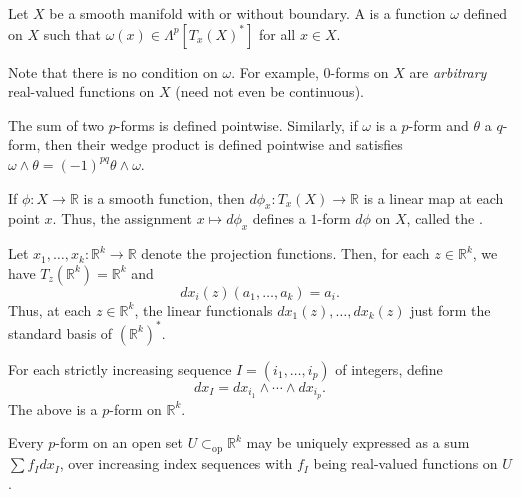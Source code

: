 \documentclass[12pt]{article}
\newcommand{\opsub}{\subset_{\operatorname{op}}}
\begin{document}
\begin{defn}
	Let $X$ be a smooth manifold with or without boundary. A  is a function $\omega$ defined on $X$ such that $\omega(x) \in \Lambda^{p}[T_{x}(X)^{\ast}]$ for all $x \in X$.
\end{defn}
Note that there is no condition on $\omega$. For example, $0$-forms on $X$ are \emph{arbitrary} real-valued functions on $X$ (need not even be continuous).

The sum of two $p$-forms is defined pointwise. Similarly, if $\omega$ is a $p$-form and $\theta$ a $q$-form, then their wedge product is defined pointwise and satisfies $\omega \wedge \theta = (-1)^{pq} \theta \wedge \omega$.

\begin{defn}
	If $\phi : X \to \mathbb{R}$ is a smooth function, then $d\phi_{x} : T_{x}(X) \to \mathbb{R}$ is a linear map at each point $x$. Thus, the assignment $x \mapsto d\phi_{x}$ defines a $1$-form $d\phi$ on $X$, called the .
\end{defn}

\begin{ex}
	Let $x_{1}, \ldots, x_{k} : \mathbb{R}^{k} \to \mathbb{R}$ denote the projection functions. Then, for each $z \in \mathbb{R}^{k}$, we have $T_{z}(\mathbb{R}^{k}) = \mathbb{R}^{k}$ and
	\begin{equation*} 
		dx_{i}(z)(a_{1}, \ldots, a_{k}) = a_{i}.
	\end{equation*}
	Thus, at each $z \in \mathbb{R}^{k}$, the linear functionals $dx_{1}(z), \ldots, dx_{k}(z)$ just form the standard basis of $(\mathbb{R}^{k})^{\ast}$.
\end{ex}

For each strictly increasing sequence $I = (i_{1}, \ldots, i_{p})$ of integers, define
\begin{equation*} 
	dx_{I} = dx_{i_{1}} \wedge \cdots \wedge dx_{i_{p}}.
\end{equation*}
The above is a $p$-form on $\mathbb{R}^{k}$.

\begin{prop}
	Every $p$-form on an open set $U \opsub \mathbb{R}^{k}$ may be uniquely expressed as a sum $\sum f_{I} dx_{I}$, over increasing index sequences with $f_{I}$ being real-valued functions on $U$.
\end{prop}
\end{document}
